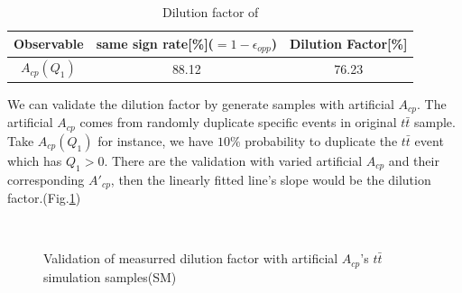 			\begin{center}
			\setlength{\tabcolsep}{12pt}
			\begin{longtable}{ c | c c }
			\caption{Dilution factor of }\\
			Observable & same sign rate[\%]($=1-\epsilon_{opp}$) & Dilution Factor[\%] \\
			\hline
			$A_{cp}(Q_1)$ & 88.12  &  76.23  \\
			\hline
			\end{longtable}
			\label{Obs:tb:SM_DF}
			\end{center}

			We can validate the dilution factor by generate samples with artificial $A_{cp}$. The artificial $A_{cp}$ comes from randomly duplicate specific events in original $t\bar{t}$ sample. Take $A_{cp}(Q_1)$ for instance, we have $10\%$ probability to duplicate the $t\bar{t}$ event which has $Q_1 > 0$. There are the validation with varied artificial $A_{cp}$ and their corresponding $A'_{cp}$, then the linearly fitted line's slope would be the dilution factor.(Fig.\ref{Obs:fig:vali_SM})

			\begin{figure}[H]
			\centering
			    \\
			\caption{Validation of measurred dilution factor with artificial $A_{cp}$'s $t\bar{t}$ simulation samples(SM)}
			\label{Obs:fig:vali_SM}
			\end{figure}
			\FloatBarrier

